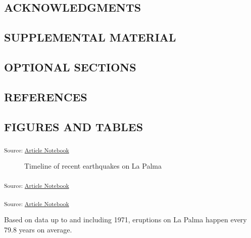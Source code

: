 \documentclass[
]{agujournal2019}
\begin{document}
\subsection{ACKNOWLEDGMENTS}\label{acknowledgments}

\subsection{SUPPLEMENTAL MATERIAL}\label{supplemental-material}

\subsection{OPTIONAL SECTIONS}\label{optional-sections}

\subsection{REFERENCES}\label{references}

\subsection{FIGURES AND TABLES}\label{figures-and-tables}

\textsubscript{Source:
\href{https://rvcrawford.github.io/glowing-system/index.qmd.html}{Article
Notebook}}

\label{cell-fig-timeline}
\begin{figure}[H]


\caption{\label{fig-timeline}Timeline of recent earthquakes on La Palma}

\end{figure}%

\textsubscript{Source:
\href{https://rvcrawford.github.io/glowing-system/index.qmd.html}{Article
Notebook}}

\textsubscript{Source:
\href{https://rvcrawford.github.io/glowing-system/index.qmd.html}{Article
Notebook}}

Based on data up to and including 1971, eruptions on La Palma happen
every 79.8 years on average.
\end{document}
